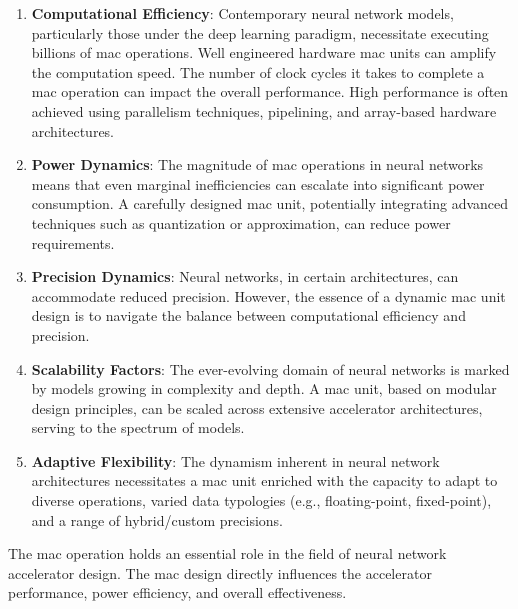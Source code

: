 \begin{enumerate}
	\item \textbf{Computational Efficiency}: Contemporary neural network models, particularly those under the deep learning paradigm, necessitate executing billions of \gls{mac} operations. Well engineered hardware \gls{mac} units can amplify the computation speed. The number of clock cycles it takes to complete a \gls{mac} operation can impact the overall performance. High performance is often achieved using parallelism techniques, pipelining, and array-based hardware architectures.
	
	\item \textbf{Power Dynamics}: The magnitude of \gls{mac} operations in neural networks means that even marginal inefficiencies can escalate into significant power consumption. A carefully designed \gls{mac} unit, potentially integrating advanced techniques such as quantization or approximation, can reduce power requirements.
	
	\item \textbf{Precision Dynamics}: Neural networks, in certain architectures, can accommodate reduced precision. However, the essence of a dynamic \gls{mac} unit design is to navigate the balance between computational efficiency and precision.
	
	\item \textbf{Scalability Factors}: The ever-evolving domain of neural networks is marked by models growing in complexity and depth. A \gls{mac} unit, based on modular design principles, can be scaled across extensive accelerator architectures, serving to the spectrum of models.
	
	\item \textbf{Adaptive Flexibility}: The dynamism inherent in neural network architectures necessitates a \gls{mac} unit enriched with the capacity to adapt to diverse operations, varied data typologies (e.g., floating-point, fixed-point), and a range of hybrid/custom precisions.
\end{enumerate}

The \gls{mac} operation holds an essential role in the field of neural network accelerator design. The \gls{mac} design directly influences the accelerator performance, power efficiency, and overall effectiveness.




